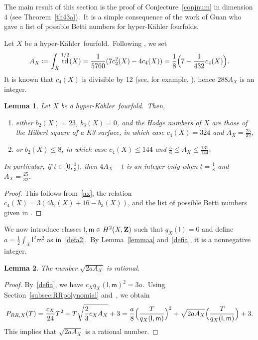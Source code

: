 \documentclass[12pt]{amsart}
\def\Z{{\bf Z}}
\DeclareMathOperator{\td}{td}
\def\hk{hyper-K\"ahler}
\newtheorem{lemm}{Lemma}[section]
\theoremstyle{remark}
\def\lll{\ensuremath{\mathsf l}}
\def\mm{\ensuremath{\mathsf m}}
\begin{document}
The main result of  this section is the proof of  Conjecture~\ref{conjnum} in dimension $4$ (see Theorem~\ref{th43a}).\ It is a simple consequence of the work \cite{gua} of Guan  who gave a list of possible Betti numbers for hyper-K\"ahler fourfolds.

Let $X$ be a \hk\ fourfold.\ Following \cite[Section~2.4]{jia}, we
 set
\begin{equation}\label{ax}
A_X\coloneqq\int_X\td^{1/2}(X)= \frac 1 {5760} ( 7c_2^2(X) -4c_4(X) ) = \frac 18 \Bigl(7-\frac 1 {432} c_4(X)\Bigr).
\end{equation}
It is known that $c_4(X)$ is divisible by 12 (see, for example, \cite[Proposition 2.4]{gr}), hence $288 A_X$ is an integer.

\begin{lemm}\label{lemmguan}
Let $X$ be a \hk\ fourfold.\ Then,
\begin{enumerate}[{\rm (a)}]
\item\label{aax} either $b_2(X) =23$,  $b_3(X) =0$, and the Hodge numbers of $X$ are those of the Hilbert square of a K3 surface, in which case $ c_4(X)= 324$ and $A_X=\frac{25}{32}$,
\item\label{bax} or $b_2(X) \le 8$, in which case $c_4(X)\le 144$ and  $\frac{5}{6}\le A_X\le \frac{131}{144}$.
 \end{enumerate}
In particular, if $t\in [0,\frac13)$, then $4A_X-t $ is an integer only when $t=\frac18$ and $A_X=\frac{25}{32}$.
\end{lemm}

\begin{proof}
This follows from~\eqref{ax}, the relation $c_4(X)=3(4b_2(X)+16-b_3(X))$, and the list of possible Betti numbers given in  \cite[Main Theorem]{gua}.
\end{proof}


We now introduce classes $\lll,\mm\in H^2(X,\Z)$ such that $q_X(\lll)=0$ and define $a=\frac12\int_X\lll^2\mm^2$ as in~\eqref{defa2}.\ By Lemma~\ref{lemmaa} and~\eqref{defia}, it is a  nonnegative integer.



\begin{lemm}\label{lemmax}
The number $\sqrt{2aA_X} $ is   rational.
\end{lemm}

\begin{proof}
By~\eqref{defia}, we have $c_Xq_X(\lll,\mm)^2=3a$.\ Using Section~\ref{subsec:RRpolynomial} and~\cite[Lemma~5.7]{jia}, we obtain
\begin{equation}\label{prr}
   P_{RR,X}(T)=\frac{c_X}{24}T^2+ T\sqrt{\frac23c_XA_X} +3=\frac{a}{8}\Bigl(\frac{T}{q_X(\lll,\mm)}\Bigr)^2+ \sqrt{2aA_X}\Bigl(\frac{T}{q_X(\lll,\mm)}\Bigr) +3.
\end{equation}
This implies that $\sqrt{2aA_X} $ is a rational number.
\end{proof}
\end{document}
